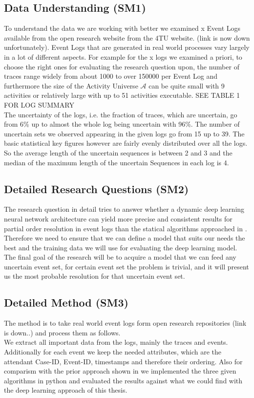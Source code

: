 \documentclass[
	a4paper,
	pagesize,
	pdftex,
	12pt,
	ngerman,
	fleqn,
	final,
	]{scrartcl}
\theoremstyle{plain}
\theoremstyle{definition}
\begin{document}
	\subsection{Data Understanding (SM1)}
	To understand the data we are working with better we examined x Event Logs available from the open research website from the 4TU website. (link is now down unfortunately). Event Logs that are generated in real world processes vary largely in a lot of different aspects. For example for the x logs we examined a priori, to choose the right ones for evaluating the research question upon, the number of traces range widely from about 1000 to over 150000 per Event Log and furthermore the size of the Activity Universe \(\mathcal{A}\) can be quite small with 9 activities or relatively large with up to 51 activities executable. SEE TABLE 1 FOR LOG SUMMARY \\ 
	The uncertainty of the logs, i.e. the fraction of traces, which are uncertain, go from 6\% up to almost the whole log being uncertain with 96\%. The number of uncertain sets we observed appearing in the given logs go from 15 up to 39.
	The basic statistical key figures however are fairly evenly distributed over all the logs. So the average length of the uncertain sequences is between 2 and 3 and the median of the maximum length of the uncertain Sequences in each log is 4. \\  
	
	\subsection{Detailed Research Questions (SM2)}
	The research question in detail tries to answer whether a dynamic deep learning neural network architecture can yield more precise and consistent results for partial order resolution in event logs than the statical algorithms approached in \cite{self}. \\
	Therefore we need to ensure that we can define a model that suits our needs the best and the training data we will use for evaluating the deep learning model. The final goal of the research will be to acquire a model that we can feed any uncertain event set, for certain event set the problem is trivial, and it will present us the most probable resolution for that uncertain event set. 
	
	\subsection{Detailed Method (SM3)}
	The method is to take real world event logs form open research repositories (link is down..) and process them as follows. \\
	We extract all important data from the logs, mainly the traces and events. Additionally for each event we keep the needed attributes, which are the attendant Case-ID, Event-ID, timestamps and therefore their ordering. 
	Also for comparism with the prior approach shown in \cite{self} we implemented the three given algorithms in python and evaluated the results against what we could find with the deep learning approach of this thesis. 
\end{document}
